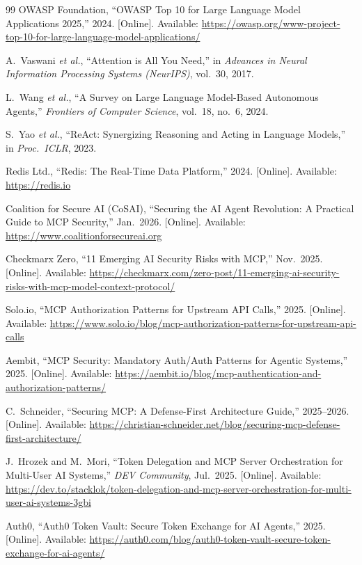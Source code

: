\documentclass[journal]{IEEEtran}
\begin{document}
\begin{thebibliography}{99}
OWASP Foundation,
``OWASP Top 10 for Large Language Model Applications 2025,''
2024. [Online]. Available:
\url{https://owasp.org/www-project-top-10-for-large-language-model-applications/}

A.\ Vaswani \textit{et al.},
``Attention is All You Need,''
in \textit{Advances in Neural Information Processing Systems (NeurIPS)},
vol.\ 30, 2017.

L.\ Wang \textit{et al.},
``A Survey on Large Language Model-Based Autonomous Agents,''
\textit{Frontiers of Computer Science}, vol.\ 18, no.\ 6, 2024.

S.\ Yao \textit{et al.},
``ReAct: Synergizing Reasoning and Acting in Language Models,''
in \textit{Proc.\ ICLR}, 2023.

Redis Ltd., ``Redis: The Real-Time Data Platform,''
2024. [Online]. Available: \url{https://redis.io}

Coalition for Secure AI (CoSAI),
``Securing the AI Agent Revolution: A Practical Guide to MCP Security,''
Jan.\ 2026.
[Online]. Available: \url{https://www.coalitionforsecureai.org}

Checkmarx Zero,
``11 Emerging AI Security Risks with MCP,''
Nov.\ 2025. [Online]. Available:
\url{https://checkmarx.com/zero-post/11-emerging-ai-security-risks-with-mcp-model-context-protocol/}

Solo.io,
``MCP Authorization Patterns for Upstream API Calls,''
2025. [Online]. Available:
\url{https://www.solo.io/blog/mcp-authorization-patterns-for-upstream-api-calls}

Aembit,
``MCP Security: Mandatory Auth/Auth Patterns for Agentic Systems,''
2025. [Online]. Available:
\url{https://aembit.io/blog/mcp-authentication-and-authorization-patterns/}

C.\ Schneider,
``Securing MCP: A Defense-First Architecture Guide,''
2025--2026. [Online]. Available:
\url{https://christian-schneider.net/blog/securing-mcp-defense-first-architecture/}

J.\ Hrozek and M.\ Mori,
``Token Delegation and MCP Server Orchestration for Multi-User AI Systems,''
\textit{DEV Community}, Jul.\ 2025.
[Online]. Available:
\url{https://dev.to/stacklok/token-delegation-and-mcp-server-orchestration-for-multi-user-ai-systems-3gbi}

Auth0,
``Auth0 Token Vault: Secure Token Exchange for AI Agents,''
2025. [Online]. Available:
\url{https://auth0.com/blog/auth0-token-vault-secure-token-exchange-for-ai-agents/}


\end{thebibliography}
\end{document}
